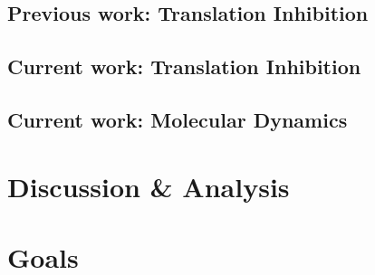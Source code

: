 \documentclass[a4paper,12pt]{article}
\begin{document}
\subsection{Previous work: Translation Inhibition}

\subsection{Current work: Translation Inhibition}
\subsection{Current work: Molecular Dynamics}



\section{Discussion \& Analysis}
\section{Goals}
\end{document}
